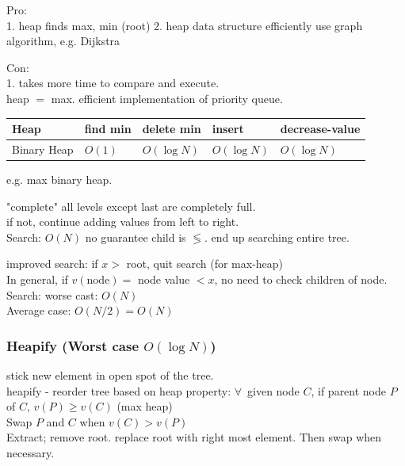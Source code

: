 \documentclass[10pt]{amsart}
\begin{document}
\begin{multicols*}{2}
Pro: \\ 
1. heap finds max, min (root)
2. heap data structure efficiently use graph algorithm, e.g. Dijkstra

Con: \\
1. takes more time to compare and execute. \\
heap $ = $ max. efficient implementation of priority queue. 

\begin{center}
	\begin{tabular}{ l | l | l | l | l  }
		\hline
		Heap & find min & delete min & insert & decrease-value \\ \hline
		Binary Heap & $O(1)$ & $O(\log{N})$ & $O(\log{N})$ & $O(\log{N})$ \\ \hline 
		\hline
	\end{tabular}
\end{center}

e.g. max binary heap.

"complete" all levels except last are completely full. \\
if not, continue adding values from left to right. \\

Search: $O(N)$ no guarantee child is $\lessgtr$. end up searching entire tree.

improved search: if $x >$ root, quit search (for max-heap) \\
In general, if $v(\text{node}) =$ node value $< x$, no need to check children of node. \\

Search: worse cast: $O(N)$ \\
\phantom{Search} Average case: $O(N/2) = O(N)$ \\

\subsubsection{Heapify (Worst case $O(\log{N})$)} 

stick new element in open spot of the tree. \\
heapify - reorder tree based on heap property: $\forall \, $ given node $C$, if parent node $P$ of $C$, $v(P) \geq v(C)$ (max heap) \\

Swap $P$ and $C$ when $v(C) > v(P)$ \\
Extract; remove root. replace root with right most element. Then swap when necessary. \\


\end{multicols*}
\end{document}

